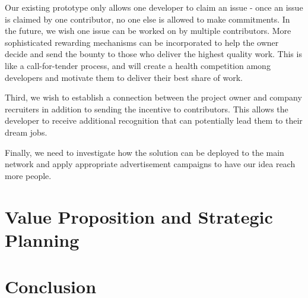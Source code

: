 \documentclass[12pt]{article}
\renewcommand{\_}{\kern-1.5pt\textunderscore\kern-1.5pt}
\begin{document}
Our existing prototype only allows one developer to claim an issue - once an issue is claimed by one contributor, no one else is allowed to make commitments. In the future, we wish one issue can be worked on by multiple contributors. More sophisticated rewarding mechanisms can be incorporated to help the owner decide and send the bounty to those who deliver the highest quality work. This is like a call-for-tender process, and will create a health competition among developers and motivate them to deliver their best share of work.

Third, we wish to establish a connection between the project owner and company recruiters in addition to sending the incentive to contributors. This allows the developer to receive additional recognition that can potentially lead them to their dream jobs.  

Finally, we need to investigate how the solution can be deployed to the main network and apply appropriate advertisement campaigns to have our idea reach more people. 

\section{Value Proposition and Strategic Planning}


\section{Conclusion}

\newpage


\begingroup
\raggedright

{}

\nocite{*}

\endgroup

\newpage
\end{document}
